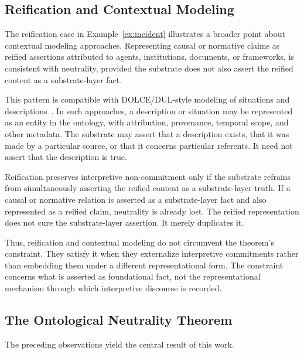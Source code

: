 \subsection{Reification and Contextual Modeling}
\label{subsec:reification}

The reification case in Example~\ref{ex:incident} illustrates
a broader point about contextual modeling approaches.
Representing causal or normative claims as reified assertions
attributed to agents,
institutions, documents, or frameworks,
is consistent with neutrality,
provided the substrate does not also assert the reified content
as a substrate-layer fact.

This pattern is compatible with DOLCE/DUL-style modeling of
situations and descriptions~\citep{borgo2022dolce}.
In such approaches, a description or situation may be represented
as an entity in the ontology,
with attribution, provenance, temporal scope,
and other metadata.
The substrate may assert that a description exists,
that it was made by a particular source,
or that it concerns particular referents.
It need not assert that the description is true.

Reification preserves interpretive non-commitment
only if the substrate refrains from simultaneously
asserting the reified content as a substrate-layer truth.
If a causal or normative relation is asserted
as a substrate-layer fact and also represented as a reified claim,
neutrality is already lost.
The reified representation does not cure
the substrate-layer assertion.
It merely duplicates it.

Thus, reification and contextual modeling do not circumvent
the theorem's constraint.
They satisfy it when they externalize interpretive commitments
rather than embedding them under a different representational form.
The constraint concerns what is asserted as foundational fact,
not the representational mechanism through which
interpretive discourse is recorded.

\subsection{The Ontological Neutrality Theorem}
\label{subsec:formal-proof}

The preceding observations yield the central result of this work.


